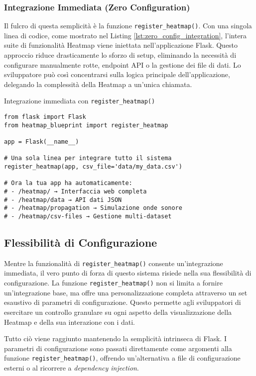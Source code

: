 \subsubsection{Integrazione Immediata (Zero Configuration)}
Il fulcro di questa semplicità è la funzione \texttt{register\_heatmap()}. Con una singola linea di codice, come mostrato nel Listing \ref{lst:zero_config_integration}, l'intera suite di funzionalità Heatmap viene iniettata nell'applicazione Flask. Questo approccio riduce drasticamente lo sforzo di setup, eliminando la necessità di configurare manualmente rotte, endpoint API o la gestione dei file di dati. Lo sviluppatore può così concentrarsi sulla logica principale dell'applicazione, delegando la complessità della Heatmap a un'unica chiamata.

\begin{listing}[H]
\caption{Integrazione immediata con \texttt{register\_heatmap()}}
\label{lst:zero_config_integration}
\begin{verbatim}
from flask import Flask
from heatmap_blueprint import register_heatmap

app = Flask(__name__)

# Una sola linea per integrare tutto il sistema
register_heatmap(app, csv_file='data/my_data.csv')

# Ora la tua app ha automaticamente:
# - /heatmap/ → Interfaccia web completa
# - /heatmap/data → API dati JSON
# - /heatmap/propagation → Simulazione onde sonore
# - /heatmap/csv-files → Gestione multi-dataset
\end{verbatim}
\end{listing}


\subsection{Flessibilità di Configurazione}
Mentre la funzionalità  di \texttt{register\_heatmap()} consente un'integrazione immediata, il vero punto di forza di questo sistema risiede nella sua flessibilità di configurazione. La funzione \texttt{register\_heatmap()} non si limita a fornire un'integrazione base, ma offre una personalizzazione completa attraverso un set esaustivo di parametri di configurazione. 
Questo permette agli sviluppatori di esercitare un controllo granulare su ogni aspetto della visualizzazione della Heatmap e della sua interazione con i dati. 


Tutto ciò viene raggiunto mantenendo la semplicità intrinseca di Flask. I parametri di configurazione sono passati direttamente come argomenti alla funzione \texttt{register\_heatmap()}, offrendo un'alternativa a file di configurazione esterni o al ricorrere a \textit{dependency injection}.


